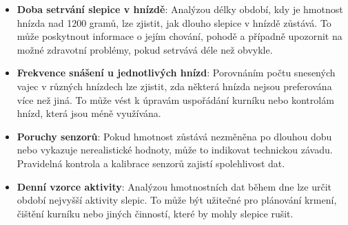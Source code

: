 \begin{itemize}
    \item \textbf{Doba setrvání slepice v hnízdě}: Analýzou délky období, kdy je hmotnost hnízda nad 1200 gramů, lze zjistit, jak dlouho slepice v hnízdě zůstává.
    To může poskytnout informace o jejím chování, pohodě a případně upozornit na možné zdravotní problémy, pokud setrvává déle než obvykle.
    \item \textbf{Frekvence snášení u jednotlivých hnízd}: Porovnáním počtu snesených vajec v různých hnízdech lze zjistit, zda některá hnízda nejsou preferována více než jiná.
    To může vést k úpravám uspořádání kurníku nebo kontrolám hnízd, která jsou méně využívána.
    \item \textbf{Poruchy senzorů}: Pokud hmotnost zůstává nezměněna po dlouhou dobu nebo vykazuje nerealistické hodnoty, může to indikovat technickou závadu.
    Pravidelná kontrola a kalibrace senzorů zajistí spolehlivost dat.
    \item \textbf{Denní vzorce aktivity}: Analýzou hmotnostních dat během dne lze určit období nejvyšší aktivity slepic.
    To může být užitečné pro plánování krmení, čištění kurníku nebo jiných činností, které by mohly slepice rušit.
\end{itemize}

%
%
%

